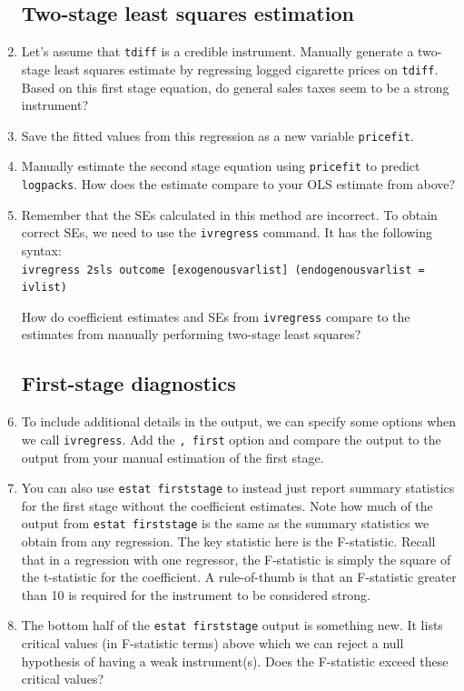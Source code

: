 \documentclass[a4paper,12pt]{article}
\begin{document}
\begin{enumerate}
\subsection*{Two-stage least squares estimation}

\item Let's assume that \texttt{tdiff} is a credible instrument. Manually generate a two-stage least squares estimate by regressing logged cigarette prices on \texttt{tdiff}. Based on this first stage equation, do general sales taxes seem to be a strong instrument?
\item Save the fitted values from this regression as a new variable \texttt{pricefit}.
\item Manually estimate the second stage equation using \texttt{pricefit} to predict \texttt{logpacks}. How does the estimate compare to your OLS estimate from above?
\item Remember that the SEs calculated in this method are incorrect. To obtain correct SEs, we need to use the \texttt{ivregress} command. It has the following syntax:\\
\texttt{ivregress 2sls outcome [exogenousvarlist] (endogenousvarlist = ivlist)}

How do coefficient estimates and SEs from \texttt{ivregress} compare to the estimates from manually performing two-stage least squares?

\subsection*{First-stage diagnostics}

\item To include additional details in the output, we can specify some options when we call \texttt{ivregress}. Add the \texttt{, first} option and compare the output to the output from your manual estimation of the first stage.
\item You can also use \texttt{estat firststage} to instead just report summary statistics for the first stage without the coefficient estimates. Note how much of the output from \texttt{estat firststage} is the same as the summary statistics we obtain from any regression. The key statistic here is the F-statistic. Recall that in a regression with one regressor, the F-statistic is simply the square of the t-statistic for the coefficient. A rule-of-thumb is that an F-statistic greater than 10 is required for the instrument to be considered strong.
\item The bottom half of the \texttt{estat firststage} output is something new. It lists critical values (in F-statistic terms) above which we can reject a null hypothesis of having a weak instrument(s). Does the F-statistic exceed these critical values?


\end{enumerate}
\end{document}
